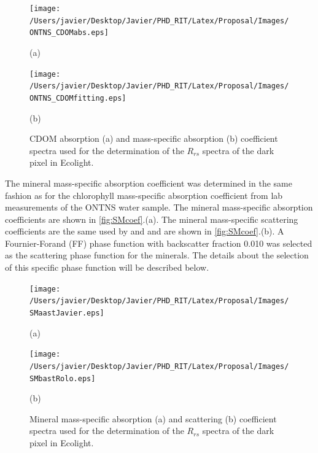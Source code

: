 \documentclass[onecolumn,3p,letterpaper]{elsarticle}
\begin{document}
\begin{figure}[htbp!]
	\begin{minipage}[c]{0.48\linewidth}
  		\centering
  		\texttt{[image: /Users/javier/Desktop/Javier/PHD\_RIT/Latex/Proposal/Images/ONTNS\_CDOMabs.eps]}
		\centerline{(a)}\medskip
  	\end{minipage}  
  	\hfill
  	\begin{minipage}[c]{0.48\linewidth}
    	\centering
  		\texttt{[image: /Users/javier/Desktop/Javier/PHD\_RIT/Latex/Proposal/Images/ONTNS\_CDOMfitting.eps]}
  		\centerline{(b)}\medskip
  	\end{minipage}  
  	\caption{CDOM absorption (a) and mass-specific absorption (b) coefficient spectra used for the determination of the $R_{rs}$ spectra of the dark pixel in Ecolight. \label{fig:CDOMcoef} }
\end{figure}

The mineral mass-specific absorption coefficient was determined in the same fashion as for the chlorophyll mass-specific absorption coefficient from lab measurements of the ONTNS water sample. The mineral mass-specific absorption coefficients are shown in \autoref{fig:SMcoef}.(a). The mineral mass-specific scattering coefficients are the same used by \cite{Raqueno:2000} and \cite{Raqueno:2003} and are shown in \autoref{fig:SMcoef}.(b). A Fournier-Forand (FF) phase function with backscatter fraction 0.010 was selected as the scattering phase function for the minerals. The details about the selection of this specific phase function will be described below.

\begin{figure}[htbp!]
	\begin{minipage}[c]{0.48\linewidth}
  		\centering
  		\texttt{[image: /Users/javier/Desktop/Javier/PHD\_RIT/Latex/Proposal/Images/SMaastJavier.eps]}
	  	\centerline{(a)}\medskip
  	\end{minipage}  
  	\hfill
  	\begin{minipage}[c]{0.48\linewidth}
  		\centering
  		\texttt{[image: /Users/javier/Desktop/Javier/PHD\_RIT/Latex/Proposal/Images/SMbastRolo.eps]}
  		\centerline{(b)}\medskip
  	\end{minipage}
  	\caption{Mineral mass-specific absorption (a) and scattering (b) coefficient spectra used for the determination of the $R_{rs}$ spectra of the dark pixel in Ecolight. \label{fig:SMcoef} }
\end{figure}
\end{document}
